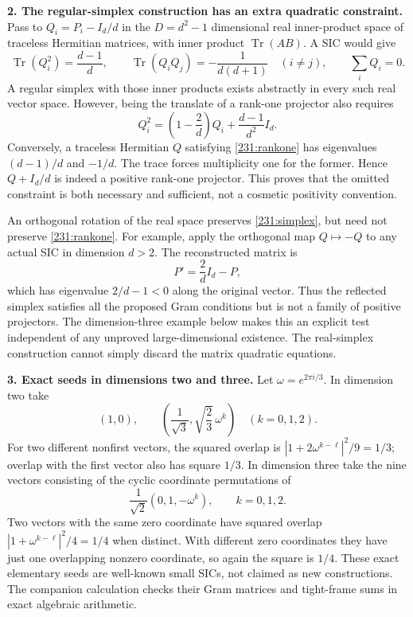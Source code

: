 \documentclass[11pt,a4paper]{article}
\numberwithin{equation}{section}
\begin{document}
\textbf{2. The regular-simplex construction has an extra quadratic constraint.}
Pass to $Q_i=P_i-I_d/d$ in the $D=d^2-1$ dimensional real inner-product
space of traceless Hermitian matrices, with inner product
$\operatorname{Tr}(AB)$. A SIC would give
\begin{equation}\label{231:simplex}
 \operatorname{Tr}(Q_i^2)=\frac{d-1}{d},\qquad
 \operatorname{Tr}(Q_iQ_j)=-\frac1{d(d+1)}\quad(i\ne j),\qquad
 \sum_iQ_i=0.
\end{equation}
A regular simplex with those inner products exists abstractly in every
such real vector space. However, being the translate of a rank-one
projector also requires
\begin{equation}\label{231:rankone}
 Q_i^2=\left(1-\frac2d\right)Q_i+\frac{d-1}{d^2}I_d.
\end{equation}
Conversely, a traceless Hermitian $Q$ satisfying
\eqref{231:rankone} has eigenvalues $(d-1)/d$ and $-1/d$.
The trace forces multiplicity one for the former. Hence $Q+I_d/d$ is
indeed a positive rank-one projector. This proves that the omitted
constraint is both necessary and sufficient, not a cosmetic positivity
convention.

An orthogonal rotation of the real space preserves
\eqref{231:simplex}, but need not preserve \eqref{231:rankone}.
For example, apply the orthogonal map $Q\mapsto-Q$ to any actual SIC
in dimension $d>2$. The reconstructed matrix is
\[
 P'=\frac{2}{d}I_d-P,
\]
which has eigenvalue $2/d-1<0$ along the original vector. Thus the
reflected simplex satisfies all the proposed Gram conditions but is
not a family of positive projectors. The dimension-three example below
makes this an explicit test independent of any unproved large-dimensional
existence. The real-simplex construction cannot simply discard the
matrix quadratic equations.

\textbf{3. Exact seeds in dimensions two and three.}
Let $\omega=e^{2\pi i/3}$. In dimension two take
\[
 (1,0),\qquad
 \left(\frac1{\sqrt3},\sqrt{\frac23}\,\omega^k\right)
       \quad(k=0,1,2).
\]
For two different nonfirst vectors, the squared overlap is
$|1+2\omega^{k-\ell}|^2/9=1/3$; overlap with the first vector also
has square $1/3$. In dimension three take the nine vectors consisting
of the cyclic coordinate permutations of
\[
 \frac1{\sqrt2}(0,1,-\omega^k),\qquad k=0,1,2.
\]
Two vectors with the same zero coordinate have squared overlap
$|1+\omega^{k-\ell}|^2/4=1/4$ when distinct. With different zero
coordinates they have just one overlapping nonzero coordinate, so
again the square is $1/4$. These exact elementary seeds are well-known
small SICs, not claimed as new constructions. The companion calculation
checks their Gram matrices and tight-frame sums in exact algebraic
arithmetic.
\end{document}
